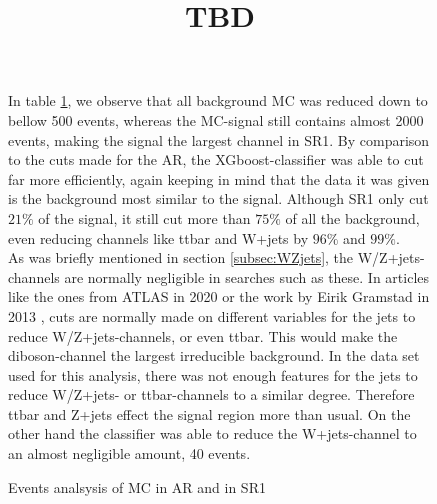 \documentclass{article}
\begin{document}
\begin{figure}
\bgroup
In table \ref{table:SR1_R}, we observe that all background MC was reduced down to bellow 500 events, whereas the MC-signal still contains almost 2000 events, making the signal the largest channel in SR1. By comparison to the cuts made for the AR, the XGboost-classifier was able to cut far more efficiently, again keeping in mind that the data it was given is the background most similar to the signal. Although SR1 only cut $21\%$ of the signal, it still cut more than $75\%$ of all the background, even reducing channels like ttbar and W+jets by $96\%$ and $99\%$.
\\
As was briefly mentioned in section \ref{subsec:WZjets}, the W/Z+jets-channels are normally negligible in searches such as these.  In articles like the ones from ATLAS in 2020 \cite{Aad_2020} or the work by Eirik Gramstad in 2013 \cite{Gramstad:2013loc}, cuts are normally made on different variables for the jets to reduce W/Z+jets-channels, or even ttbar. This would make the diboson-channel the largest irreducible background. In the data set used for this analysis, there was not enough features for the jets to reduce W/Z+jets- or ttbar-channels to a similar degree. Therefore ttbar and Z+jets effect the signal region more than usual. On the other hand the classifier was able to reduce the W+jets-channel to an almost negligible amount, 40 events.
\title{TBD}
{\tabcolsep=20pt
\begin{table}
    \caption{Events analsysis of MC in AR and in SR1}
    \centering 
    \begin{threeparttable}
    \end{threeparttable}
    \label{table:SR1_R}
\end{table}
}
\egroup
\end{figure}
\end{document}

